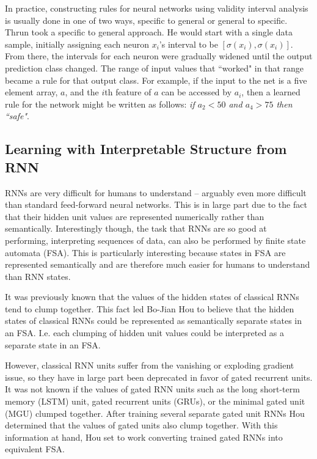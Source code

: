\documentclass[12pt, letterpaper]{article}
\begin{document}
	In practice, constructing rules for neural networks using validity interval analysis is usually done in one of two ways, specific to general or general to specific. Thrun took a specific to general approach. He would start with a single data sample, initially assigning each neuron $x_{i}$'s interval to be $[\sigma(x_{i}), \sigma(x_{i})]$. From there, the intervals for each neuron were gradually widened until the output prediction class changed. The range of input values that ``worked" in that range became a rule for that output class. For example, if the input to the net is a five element array, $a$, and the $i$th feature of $a$ can be accessed by $a_{i}$, then a learned rule for the network might be written as follows: \textit{if $a_{2} < 50$ and $a_{4} > 75$ then ``safe"}.

\subsection{Learning with Interpretable Structure from RNN}
RNNs are very difficult for humans to understand -- arguably even more difficult than standard feed-forward neural networks. This is in large part due to the fact that their hidden unit values are represented numerically rather than semantically. Interestingly though, the task that RNNs are so good at performing, interpreting sequences of data, can also be performed by finite state automata (FSA). This is particularly interesting because states in FSA are represented semantically and are therefore much easier for humans to understand than RNN states.

It was previously known that the values of the hidden states of classical RNNs tend to clump together. This fact led Bo-Jian Hou to believe that the hidden states of classical RNNs could be represented as semantically separate states in an FSA. I.e. each clumping of hidden unit values could be interpreted as a separate state in an FSA.

However, classical RNN units suffer from the vanishing or exploding gradient issue, so they have in large part been deprecated in favor of gated recurrent units.
It was not known if the values of gated RNN units such as the long short-term memory (LSTM) unit, gated recurrent units (GRUs), or the minimal gated unit (MGU) clumped together. After training several separate gated unit RNNs Hou determined that the values of gated units also clump together.
With this information at hand, Hou set to work converting trained gated RNNs into equivalent FSA.
\end{document}
